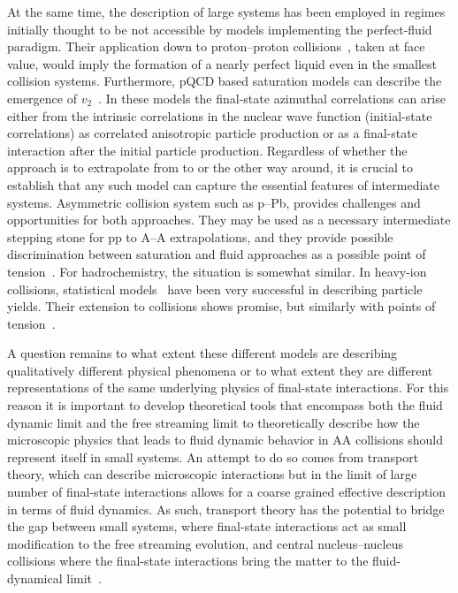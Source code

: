 \documentclass[../report.tex]{subfiles}
\begin{document}
At the same time, the description of large systems has been employed in regimes initially thought to be not accessible by models implementing the perfect-fluid paradigm. Their application down to proton--proton collisions~\cite{Werner:2007bf,Weller:2017tsr,Aidala:2018mcw}, taken at face value, would imply the formation of a nearly perfect liquid even in the smallest collision systems. Furthermore, pQCD based saturation models can describe the emergence of $v_2$~\cite{Schenke:2016lrs}. In these models the final-state azimuthal correlations can arise either from the intrinsic correlations in the nuclear wave function (initial-state correlations) as correlated anisotropic particle production or as a final-state interaction after the initial particle production.
Regardless of whether the approach is to extrapolate from \pp to \PbPb or the other way around, it is crucial to establish that any such model can capture the essential features of intermediate systems. Asymmetric collision system such as p–Pb, provides challenges and opportunities for both approaches. They may be used as a necessary intermediate stepping stone for pp to A–A extrapolations, and they provide possible discrimination between saturation and fluid approaches as a possible point of tension~\cite{Mace:2018vwq,Nagle:2018ybc}. For hadrochemistry, the situation is somewhat similar. In heavy-ion collisions, statistical models~\cite{BraunMunzinger:2003zd} have been very successful in describing particle yields. Their extension to \pp collisions shows promise, but similarly with points of tension~\cite{Vislavicius:2016rwi}.

A question remains to what extent these different models are describing qualitatively different physical phenomena or to what extent they are different representations of the same underlying physics of final-state interactions. For this reason it is important to develop theoretical tools that encompass both the fluid dynamic limit and the free streaming limit to theoretically describe how the microscopic physics that leads to fluid dynamic behavior in AA collisions should represent itself in small systems. 
An attempt to do so comes from transport theory, which can describe microscopic interactions but in the limit of large number of final-state interactions allows for a coarse grained effective description in terms of fluid dynamics.  As such, transport theory has the potential to bridge the gap between small systems, where final-state interactions act as small modification to the free streaming evolution, and central nucleus–nucleus collisions where the final-state interactions bring the matter to the fluid-dynamical limit~\cite{Kurkela:2018qeb}.
\end{document}
